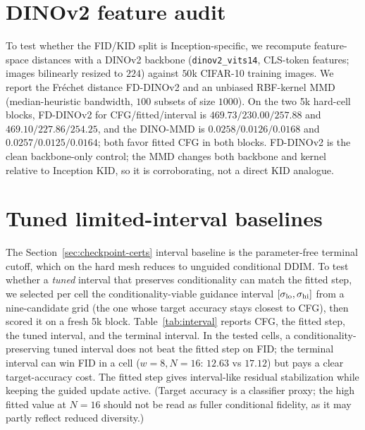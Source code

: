 \documentclass{article} %
\theoremstyle{plain}
\theoremstyle{definition}
\theoremstyle{remark}
\begin{document}
\section{DINOv2 feature audit}
\label{app:dino}

To test whether the FID/KID split is Inception-specific, we recompute
feature-space distances with a DINOv2 backbone (\texttt{dinov2\_vits14},
CLS-token features; images bilinearly resized to $224$) against $50$k
CIFAR-10 training images.  We report the Fr\'echet distance FD-DINOv2 and an
unbiased RBF-kernel MMD (median-heuristic bandwidth, $100$ subsets of size
$1000$).  On the two 5k hard-cell blocks, FD-DINOv2 for CFG/fitted/interval is
$469.73/230.00/257.88$ and $469.10/227.86/254.25$, and the DINO-MMD is
$0.0258/0.0126/0.0168$ and $0.0257/0.0125/0.0164$; both favor fitted CFG in
both blocks.  FD-DINOv2 is the clean backbone-only control; the MMD changes
both backbone and kernel relative to Inception KID, so it is corroborating,
not a direct KID analogue.

\section{Tuned limited-interval baselines}
\label{app:interval}

The Section~\ref{sec:checkpoint-certs} interval baseline is the parameter-free
terminal cutoff, which on the hard mesh reduces to unguided conditional DDIM.
To test whether a \emph{tuned} interval that preserves conditionality can match
the fitted step, we selected per cell the conditionality-viable guidance
interval $[\sigma_{\rm lo},\sigma_{\rm hi}]$ from a nine-candidate grid (the one
whose target accuracy stays closest to CFG), then scored it on a fresh 5k block.
Table~\ref{tab:interval} reports CFG, the fitted step, the tuned interval, and
the terminal interval.  In the tested cells, a conditionality-preserving tuned
interval does not beat the fitted step on FID; the terminal interval can win FID
in a cell
($w{=}8,N{=}16$: $12.63$ vs $17.12$) but pays a clear target-accuracy cost.  The
fitted step gives interval-like residual stabilization while keeping the guided
update active.  (Target accuracy is a classifier proxy; the high fitted value at
$N{=}16$ should not be read as fuller conditional fidelity, as it may partly
reflect reduced diversity.)
\end{document}
